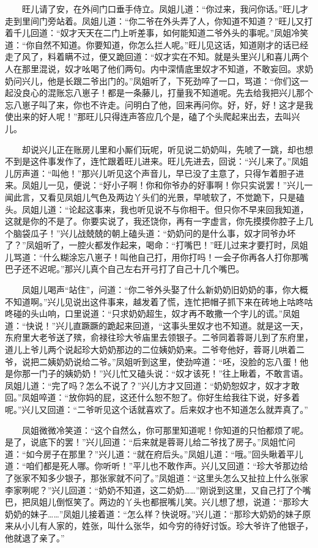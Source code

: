 　　旺儿请了安，在外间门口垂手侍立。凤姐儿道：“你过来，我问你话。”旺儿才走到里间门旁站着。凤姐儿道：“你二爷在外头弄了人，你知道不知道？”旺儿又打着千儿回道：“奴才天天在二门上听差事，如何能知道二爷外头的事呢。”凤姐冷笑道：“你自然不知道。你要知道，你怎么拦人呢。”旺儿见这话，知道刚才的话已经走了风了，料着瞒不过，便又跪回道：“奴才实在不知。就是头里兴儿和喜儿两个人在那里混说，奴才吆喝了他们两句。内中深情底里奴才不知道，不敢妄回。求奶奶问兴儿，他是长跟二爷出门的。”凤姐听了，下死劲啐了一口，骂道：“你们这一起没良心的混账忘八崽子！都是一条藤儿，打量我不知道呢。先去给我把兴儿那个忘八崽子叫了来，你也不许走。问明白了他，回来再问你。好，好，好！这才是我使出来的好人呢！”那旺儿只得连声答应几个是，磕了个头爬起来出去，去叫兴儿。

　　却说兴儿正在账房儿里和小厮们玩呢，听见说二奶奶叫，先唬了一跳，却也想不到是这件事发作了，连忙跟着旺儿进来。旺儿先进去，回说：“兴儿来了。”凤姐儿厉声道：“叫他！”那兴儿听见这个声音儿，早已没了主意了，只得乍着胆子进来。凤姐儿一见，便说：“好小子啊！你和你爷办的好事啊！你只实说罢！”兴儿一闻此言，又看见凤姐儿气色及两边丫头们的光景，早唬软了，不觉跪下，只是磕头。凤姐儿道：“论起这事来，我也听见说不与你相干。但只你不早来回我知道，这就是你的不是了。你要实说了，我还饶你，再有一字虚言，你先摸摸你腔子上几个脑袋瓜子！”兴儿战兢兢的朝上磕头道：“奶奶问的是什么事，奴才同爷办坏了？”凤姐听了，一腔火都发作起来，喝命：“打嘴巴！”旺儿过来才要打时，凤姐儿骂道：“什么糊涂忘八崽子！叫他自己打，用你打吗！一会子你再各人打你那嘴巴子还不迟呢。”那兴儿真个自己左右开弓打了自己十几个嘴巴。

　　凤姐儿喝声“站住”，问道：“你二爷外头娶了什么新奶奶旧奶奶的事，你大概不知道啊。”兴儿见说出这件事来，越发着了慌，连忙把帽子抓下来在砖地上咕咚咕咚碰的头山响，口里说道：“只求奶奶超生，奴才再不敢撒一个字儿的谎。”凤姐道：“快说！”兴儿直蹶蹶的跪起来回道，“这事头里奴才也不知道。就是这一天，东府里大老爷送了殡，俞禄往珍大爷庙里去领银子。二爷同着蓉哥儿到了东府里，道儿上爷儿两个说起珍大奶奶那边的二位姨奶奶来。二爷夸他好，蓉哥儿哄着二爷，说把二姨奶奶说给二爷。”凤姐听到这里，使劲啐道：“呸，没脸的忘八蛋！他是你那一门子的姨奶奶！”兴儿忙又磕头说：“奴才该死！”往上瞅着，不敢言语。凤姐儿道：“完了吗？怎么不说了？”兴儿方才又回道：“奶奶恕奴才，奴才才敢回。”凤姐啐道：“放你妈的屁，这还什么恕不恕了。你好生给我往下说，好多着呢。”兴儿又回道：“二爷听见这个话就喜欢了。后来奴才也不知道怎么就弄真了。”

　　凤姐微微冷笑道：“这个自然么，你可那里知道呢！你知道的只怕都烦了呢。是了，说底下的罢！”兴儿回道：“后来就是蓉哥儿给二爷找了房子。”凤姐忙问道：“如今房子在那里？”兴儿道：“就在府后头。”凤姐儿道：“哦。”回头瞅着平儿道：“咱们都是死人哪。你听听！”平儿也不敢作声。兴儿又回道：“珍大爷那边给了张家不知多少银子，那张家就不问了。”凤姐道：“这里头怎么又扯拉上什么张家李家咧呢？”兴儿回道：“奶奶不知道，这二奶奶……”刚说到这里，又自己打了个嘴巴，把凤姐儿倒怄笑了。两边的丫头也都抿嘴儿笑。兴儿想了想，说道：“那珍大奶奶的妹子……”凤姐儿接着道：“怎么样？快说呀。”兴儿道：“那珍大奶奶的妹子原来从小儿有人家的，姓张，叫什么张华，如今穷的待好讨饭。珍大爷许了他银子，他就退了亲了。”

